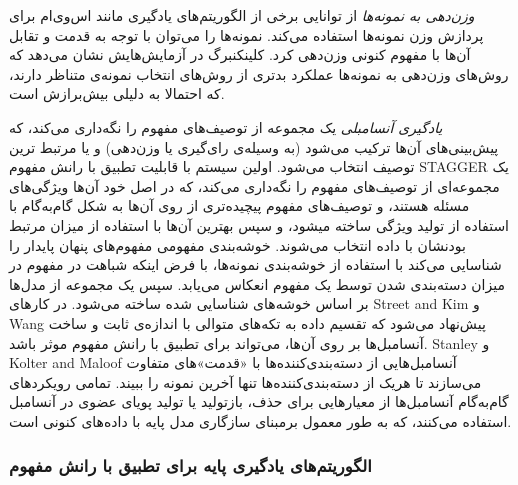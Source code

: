 
\textit{
وزن‌دهی به نمونه‌ها
} 
از توانایی برخی از الگوریتم‌های یادگیری مانند اس‌وی‌ام
برای پردازش وزن نمونه‌ها استفاده می‌کند.
\cite{klinkenberg2004}
نمونه‌ها را می‌توان با توجه به قدمت
 و تقابل آن‌ها با مفهوم کنونی وزن‌دهی کرد.  کلینکنبرگ
\cite{klinkenberg2004}
در آزمایش‌هایش نشان می‌دهد که روش‌های وزن‌دهی به نمونه‌ها عملکرد بدتری از روش‌های انتخاب نمونه‌ی متناظر دارند، که احتمالا به دلیلی بیش‌برازش
است.



\textit{
یادگیری آنسامبلی
} 
یک مجموعه از توصیف‌های مفهوم را نگه‌داری می‌کند، که پیش‌بینی‌های آن‌ها ترکیب می‌شود (به وسیله‌ی رای‌گیری یا وزن‌دهی) و یا مرتبط ترین توصیف انتخاب می‌شود. اولین سیستم با قابلیت تطبیق با رانش مفهوم 
STAGGER 
یک مجموعه‌ای از توصیف‌های مفهوم را نگه‌داری می‌کند، که در اصل خود آن‌ها ویژگی‌های مسئله هستند، و توصیف‌های مفهوم پیچیده‌تری از روی آن‌ها به شکل گام‌به‌گام
با استفاده از تولید ویژگی
ساخته میشود، و سپس بهترین آن‌ها با استفاده از میزان مرتبط بودنشان با داده انتخاب می‌شوند. خوشه‌بندی مفهومی
 \cite{harriessammut1998}
مفهوم‌های پنهان پایدار
را شناسایی می‌کند با استفاده از خوشه‌بندی نمونه‌ها، با فرض اینکه شباهت در مفهوم در میزان دسته‌بندی شدن توسط یک مفهوم انعکاس می‌یابد. سپس یک مجموعه از مدل‌ها بر اساس خوشه‌های شناسایی شده ساخته می‌شود. در کارهای 
Street and Kim
\cite{streetkim2001} 
و 
Wang
\cite{wangetal2003}
پیش‌نهاد می‌شود که تقسیم داده به تکه‌های
متوالی با اندازه‌ی ثابت و ساخت آنسامبل‌ها بر روی آن‌ها، می‌تواند برای تطبیق با رانش مفهوم موثر باشد. 
Stanley
\cite{stanley2003} 
و 
Kolter and Maloof
\cite{koltermaloof2003}
آنسامبل‌هایی از دسته‌بندی‌کننده‌ها
با «قدمت»های متفاوت می‌سازند تا هریک از دسته‌بندی‌کننده‌ها تنها آخرین نمونه را ببیند. تمامی رویکردهای گام‌به‌گام آنسامبل‌ها از معیارهایی
برای حذف، بازتولید یا تولید پویای
عضوی در آنسامبل استفاده می‌کنند، که به طور معمول برمبنای سازگاری
مدل پایه با داده‌های کنونی است. 


\subsubsection{
الگوریتم‌های یادگیری پایه برای تطبیق با رانش مفهوم
}

